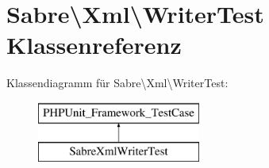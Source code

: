 \hypertarget{class_sabre_1_1_xml_1_1_writer_test}{}\section{Sabre\textbackslash{}Xml\textbackslash{}Writer\+Test Klassenreferenz}
\label{class_sabre_1_1_xml_1_1_writer_test}
Klassendiagramm für Sabre\textbackslash{}Xml\textbackslash{}Writer\+Test\+:\begin{figure}[H]
\begin{center}
\leavevmode
\includegraphics[height=2.000000cm]{class_sabre_1_1_xml_1_1_writer_test}
\end{center}
\end{figure}
